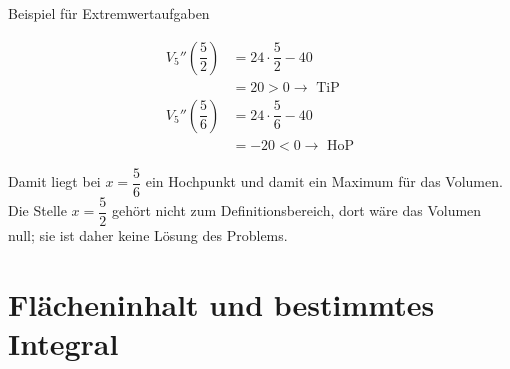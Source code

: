 \begin{bsp}{Beispiel für Extremwertaufgaben}{}
\begin{itemize}
\begin{equation*}
\begin{split}
          V_5''\left(\dfrac{5}{2}\right) &= 24\cdot \dfrac{5}{2} -40\\
          &= 20>0 \longrightarrow \text{ TiP}\\
          V_5''\left(\dfrac{5}{6}\right) &= 24\cdot \dfrac{5}{6} -40\\
          &= -20 <0 \longrightarrow \text{ HoP}
        \end{split}
    \end{equation*}
\end{itemize}
Damit liegt bei $x= \dfrac{5}{6}$ ein Hochpunkt und damit ein Maximum für das Volumen. Die Stelle $x= \dfrac{5}{2}$ gehört nicht zum Definitionsbereich, dort wäre das Volumen null; sie ist daher keine Lösung des Problems.
\end{bsp}
\section{Flächeninhalt und bestimmtes Integral}
